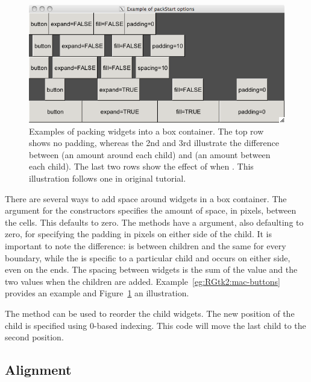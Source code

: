 \begin{figure}
  \centering
  \includegraphics[width=.85\textwidth]{ex-RGtk2-pack-start}
  \caption{Examples of packing widgets into a box container. The top
    row shows no padding, whereas the 2nd and 3rd illustrate the
    difference between  (an amount around each child)
    and  (an amount between each child). The last two
    rows show the effect of  when . This
    illustration follows one in original \GTK\/ tutorial.}
  \label{fig:RGtk2-pack-start}
\end{figure}

There are several ways to add space around widgets in a box container.
The  argument for the constructors
specifies the amount of space, in pixels, between the cells. This
defaults to zero. The  methods have a
 argument, also defaulting to zero,
for specifying the padding in pixels on either side of the child. It
is important to note the difference:  is between
children and the same for every boundary, while the  is
specific to a particular child and occurs on either side, even on the
ends. The spacing between widgets is the sum of the 
value and the two  values when the children are added.
Example~\ref{eg:RGtk2:mac-buttons} provides an example and
Figure~\ref{fig:RGtk2-pack-start} an illustration.

The  method can be used
to reorder the child widgets. The new position of the child is
specified using 0-based indexing. This code will move the last child
to the second position.
\begin{Schunk}
\end{Schunk}

\subsection{Alignment}
\label{sec:RGtk2:layout:align}

